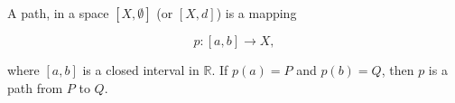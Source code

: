 A path, in a space $[X, \emptyset]$ (or $[X, d]$) is a mapping

$$p: [a, b] \rightarrow X,$$

where $[a, b]$ is a closed interval in $\mathbb{R}$. If $p(a) = P$ and $p(b) = Q$, then $p$ is a path from $P$ to $Q$.
